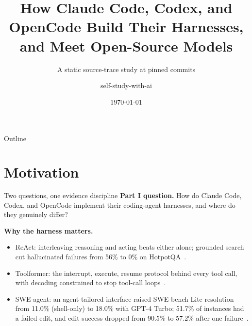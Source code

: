 \documentclass[aspectratio=169,11pt]{beamer}
\title[Harnesses and open-model support]{How Claude Code, Codex, and
OpenCode Build Their Harnesses, and Meet Open-Source Models}
\subtitle{A static source-trace study at pinned commits}
\author[self-study-with-ai]{self-study-with-ai}
\date{\today}
\newcommand{\codex}[0]{Codex}
\newcommand{\occ}[0]{OpenCode}
\newcommand{\ccc}[0]{Claude Code}
\begin{document}
\begin{frame}
  \titlepage
\end{frame}

\begin{frame}{Outline}
  \tableofcontents
\end{frame}

\section{Motivation}

\begin{frame}{Two questions, one evidence discipline}
  \textbf{Part I question.} How do \ccc{}, \codex{}, and \occ{} implement
  their coding-agent harnesses, and where do they genuinely differ?

  \vspace{0.4em}
  \textbf{Why the harness matters.}
  \begin{itemize}
    \item ReAct: interleaving reasoning and acting beats either alone;
      grounded search cut hallucinated failures from 56\% to 0\% on
      HotpotQA~\citep{yao2023react}.
    \item Toolformer: the interrupt, execute, resume protocol behind every
      tool call, with decoding constrained to stop tool-call
      loops~\citep{schick2023toolformer}.
    \item SWE-agent: an agent-tailored interface raised SWE-bench Lite
      resolution from 11.0\% (shell-only) to 18.0\% with GPT-4 Turbo;
      51.7\% of instances had a failed edit, and edit success dropped from
      90.5\% to 57.2\% after one failure~\citep{yang2024sweagent}.
  \end{itemize}
\end{frame}
\end{document}
